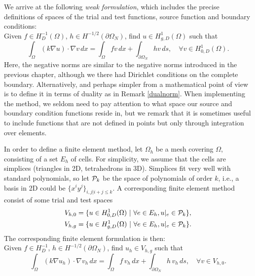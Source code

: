 We arrive at the following \emph{weak formulation}, which includes the precise definitions of spaces of the trial and test functions, source function and boundary conditions: \\
Given $f\in H^{-1}_D(\Omega)$, $h\in H^{-1/2}(\partial \Omega_N)$,  
find $u\in  H^1_{g, D} (\Omega)$ such that  
\begin{equation}
\label{chp3:weak} 
\int_\Omega (k \nabla u) \cdot \nabla v \, dx = \int_\Omega f v \, dx + \int_{\partial \Omega_N} h v \, ds, \quad    \forall v\in  H^1_{0, D} (\Omega).  
\end{equation} 
Here, the negative norms are similar to the negative norms introduced in the previous chapter, although we there had Dirichlet conditions
on the complete boundary. Alternatively, and perhaps simpler from a mathematical point of view is to define it in terms of duality as
in Remark \ref{dualnorm}. When implementing the method, we seldom need to pay attention to what space our source and boundary condition functions reside in, but we remark
that it is sometimes useful to include functions that are not defined in points but only through integration over elements.  

In order to define a finite element method, let $\Omega_h$ be a mesh covering $\Omega$, consisting of a set $E_h$ of cells. 
For simplicity, we assume that the cells are simplices (triangles in 2D, tetrahedrons in 3D). Simplices 
fit very well with standard polynomials, so let ${\cal P}_k$ be the space of 
polynomials of order $k$, i.e., a basis in 2D could be $\{x^i y^{j} \}_{i,j | i+j \le k}$.   
A corresponding finite element method consist of some trial and test spaces 
\begin{align}
V_{h, 0}  &= \{ u \in H^1_{0,D}(\Omega) \ | \  \forall e \in E_h, u|_e \in {\cal P}_k \}, \\   
V_{h, g}  &= \{ u \in H^1_{g,D}(\Omega) \ | \  \forall e \in E_h, u|_e \in {\cal P}_k \} .  
\end{align}
The corresponding finite element formulation is then: \\ 
Given $f\in H^{-1}_D$, $h\in H^{-1/2}(\partial \Omega_N)$,  
find $u_h\in  V_{h, g} $ such that  
\begin{equation}
\label{chp3:fem} 
\int_\Omega (k \nabla u_h ) \cdot \nabla v_h \, dx = \int_\Omega f \, v_h \, dx + \int_{\partial \Omega_N} h \, v_h \, ds, \quad    \forall v\in  V_{h, 0} .  
\end{equation} 


